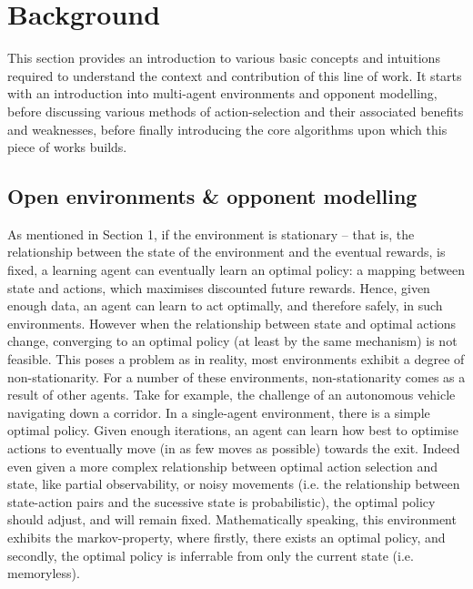\section{Background}\label{Background}
This section provides an introduction to various basic concepts and intuitions required to understand the context and contribution of this line of work. It starts with an introduction into multi-agent environments and opponent modelling, before discussing various methods of action-selection and their associated benefits and weaknesses, before finally introducing the core algorithms upon which this piece of works builds. 

\subsection{Open environments \& opponent modelling}
As mentioned in Section 1, if the environment is stationary -- that is, the relationship between the state of the environment and the eventual rewards, is fixed, a learning agent can eventually learn an optimal policy: a mapping between state and actions, which maximises discounted future rewards. 
Hence, given enough data, an agent can learn to act optimally, and therefore safely, in such environments. However when the relationship between state and optimal actions change, converging to an optimal policy (at least by the same mechanism) is not feasible. This poses a problem as in reality, most environments exhibit a degree of non-stationarity. For a number of these environments, non-stationarity comes as a result of other agents. Take for example, the challenge of an autonomous vehicle navigating down a corridor. 
\newline \newline
In a single-agent environment, there is a simple optimal policy. Given enough iterations, an agent can learn how best to optimise actions to eventually move (in as few moves as possible) towards the exit. 
\newline \newline
Indeed even given a more complex relationship between optimal action selection and state, like partial observability, or noisy movements (i.e. the relationship between state-action pairs and the sucessive state is probabilistic), the optimal policy should adjust, and will remain fixed. Mathematically speaking, this environment exhibits the markov-property, where firstly, there exists an optimal policy, and secondly, the optimal policy is inferrable from only the current state (i.e. memoryless).
